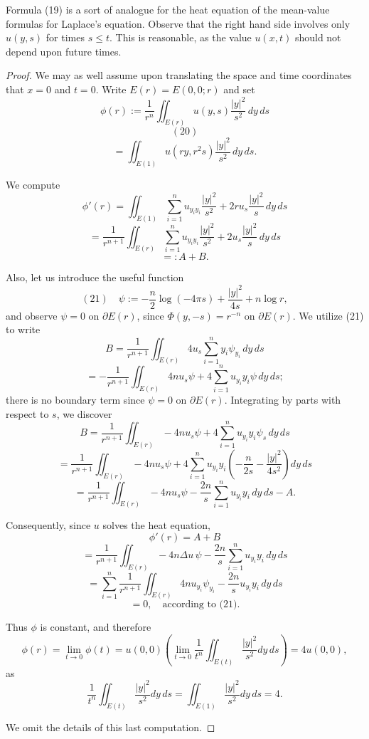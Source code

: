 Formula (19) is a sort of analogue for the heat equation of the mean-value formulas for Laplace's equation. Observe that the right hand side involves only $u(y,s)$ for times $s \leq t$. This is reasonable, as the value $u(x,t)$ should not depend upon future times.

\begin{proof}
We may as well assume upon translating the space and time coordinates that $x = 0$ and $t = 0$. Write $E(r) = E(0,0;r)$ and set
$$\phi(r) := \frac{1}{r^n} \iint_{E(r)} u(y,s) \frac{|y|^2}{s^2} \, dy\,ds$$
$$(20)$$
$$= \iint_{E(1)} u(ry, r^2 s) \frac{|y|^2}{s^2} \, dy\,ds.$$

We compute
$$\phi'(r) = \iint_{E(1)} \sum_{i=1}^{n} u_{y_i y_i} \frac{|y|^2}{s^2} + 2ru_s \frac{|y|^2}{s} \, dy\,ds$$
$$= \frac{1}{r^{n+1}} \iint_{E(r)} \sum_{i=1}^{n} u_{y_i y_i} \frac{|y|^2}{s^2} + 2u_s \frac{|y|^2}{s} \, dy\,ds$$
$$=: A + B.$$

Also, let us introduce the useful function
$$(21) \quad \psi := -\frac{n}{2} \log(-4\pi s) + \frac{|y|^2}{4s} + n \log r,$$
and observe $\psi = 0$ on $\partial E(r)$, since $\Phi(y,-s) = r^{-n}$ on $\partial E(r)$. We utilize (21) to write
$$B = \frac{1}{r^{n+1}} \iint_{E(r)} 4u_s \sum_{i=1}^{n} y_i \psi_{y_i} \, dy\,ds$$
$$= -\frac{1}{r^{n+1}} \iint_{E(r)} 4nu_s \psi + 4 \sum_{i=1}^{n} u_{y_i} y_i \psi \, dy\,ds;$$
there is no boundary term since $\psi = 0$ on $\partial E(r)$. Integrating by parts with respect to $s$, we discover
$$B = \frac{1}{r^{n+1}} \iint_{E(r)} -4nu_s \psi + 4 \sum_{i=1}^{n} u_{y_i} y_i \psi_s \, dy \, ds$$
$$= \frac{1}{r^{n+1}} \iint_{E(r)} -4nu_s \psi + 4 \sum_{i=1}^{n} u_{y_i} y_i \left( -\frac{n}{2s} - \frac{|y|^2}{4s^2} \right) dy \, ds$$
$$= \frac{1}{r^{n+1}} \iint_{E(r)} -4nu_s \psi - \frac{2n}{s} \sum_{i=1}^{n} u_{y_i} y_i \, dy \, ds - A.$$

Consequently, since $u$ solves the heat equation,
$$\phi'(r) = A + B$$
$$= \frac{1}{r^{n+1}} \iint_{E(r)} -4n \Delta u \, \psi - \frac{2n}{s} \sum_{i=1}^{n} u_{y_i} y_i \, dy \, ds$$
$$= \sum_{i=1}^{n} \frac{1}{r^{n+1}} \iint_{E(r)} 4n u_{y_i} \psi_{y_i} - \frac{2n}{s} u_{y_i} y_i \, dy \, ds$$
$$= 0, \quad \text{according to (21).}$$

Thus $\phi$ is constant, and therefore
$$\phi(r) = \lim_{t \to 0} \phi(t) = u(0,0) \left( \lim_{t \to 0} \frac{1}{t^n} \iint_{E(t)} \frac{|y|^2}{s^2} dy \, ds \right) = 4u(0,0),$$
as
$$\frac{1}{t^n} \iint_{E(t)} \frac{|y|^2}{s^2} dy \, ds = \iint_{E(1)} \frac{|y|^2}{s^2} dy \, ds = 4.$$

We omit the details of this last computation.
\end{proof}

